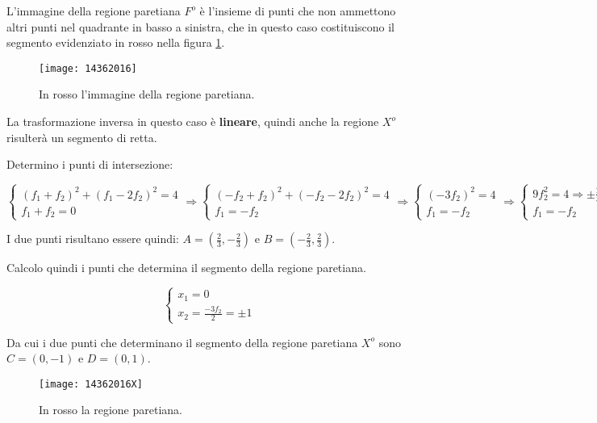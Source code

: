 \documentclass[\main/main.tex]{subfiles}
\begin{document}
L'immagine della regione paretiana $F^o$ è l'insieme di punti che non ammettono altri punti nel quadrante in basso a sinistra, che in questo caso costituiscono il segmento evidenziato in rosso nella figura \ref{area_paretiana_3}.

\begin{figure}
	\texttt{[image: 14362016]}
	\caption{In rosso l'immagine della regione paretiana.}
	\label{area_paretiana_3}
\end{figure}

La trasformazione inversa in questo caso è \textbf{lineare}, quindi anche la regione $X^o$ risulterà un segmento di retta.

Determino i punti di intersezione:

\[
	\begin{cases}
		\left( f_1 + f_2 \right)^2 + \left(f_1 - 2f_2\right)^2 = 4 \\
		f_1 + f_2 = 0
	\end{cases}
	\Rightarrow
	\begin{cases}
		\left( -f_2 + f_2 \right)^2 + \left(-f_2 - 2f_2\right)^2 = 4 \\
		f_1 = -f_2
	\end{cases}
	\Rightarrow
	\begin{cases}
		\left(-3f_2\right)^2 = 4 \\
		f_1 = -f_2
	\end{cases}
	\Rightarrow
	\begin{cases}
		9f_2^2 = 4 \Rightarrow \pm \frac{2}{3} \\
		f_1 = -f_2
	\end{cases}
\]

I due punti risultano essere quindi: $A = (\frac{2}{3}, -\frac{2}{3})$ e $B = (-\frac{2}{3}, \frac{2}{3})$.

Calcolo quindi i punti che determina il segmento della regione paretiana.

\[
	\begin{cases}
		x_1  = 0 \\
		x_2  = \frac{-3f_2}{2} = \pm 1
	\end{cases}
\]

Da cui i due punti che determinano il segmento della regione paretiana $X^o$ sono $C = (0, -1)$ e $D = (0, 1)$.

\begin{figure}
	\texttt{[image: 14362016X]}
	\caption{In rosso la regione paretiana.}
	\label{area_paretiana_4}
\end{figure}
\end{document}

